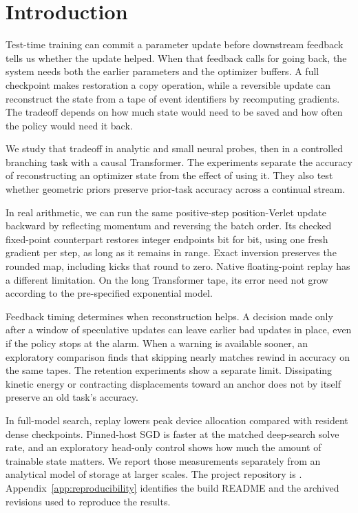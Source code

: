 \section{Introduction}
\label{sec:introduction}

Test-time training can commit a parameter update before downstream
feedback tells us whether the update helped. When that feedback calls for
going back, the system needs both the earlier parameters and the optimizer
buffers. A full checkpoint makes restoration a copy operation, while a
reversible update can reconstruct the state from a tape of event
identifiers by recomputing gradients. The tradeoff depends on how much
state would need to be saved and how often the policy would need it back.

We study that tradeoff in analytic and small neural probes, then in a
controlled branching task with a causal Transformer. The experiments
separate the accuracy of reconstructing an optimizer state from the
effect of using it. They also test whether geometric priors preserve
prior-task accuracy across a continual stream.

In real arithmetic, we can run the same positive-step position-Verlet
update backward by reflecting momentum and reversing the batch order.
Its checked fixed-point counterpart restores integer endpoints bit for bit,
using one fresh gradient per step, as long as it remains in range.
Exact inversion preserves the rounded map, including kicks that round to
zero. Native floating-point replay has a different limitation. On the long
Transformer tape, its error need not grow according to the pre-specified
exponential model.

Feedback timing determines when reconstruction helps. A decision made
only after a window of speculative updates can leave earlier bad updates
in place, even if the policy stops at the alarm. When a warning is
available sooner, an exploratory comparison finds that skipping nearly
matches rewind in accuracy on the same tapes. The retention experiments
show a separate limit. Dissipating kinetic energy or contracting
displacements toward an anchor does not by itself preserve an old
task's accuracy.

In full-model search, replay lowers peak device allocation compared with
resident dense checkpoints. Pinned-host SGD is faster at the
matched deep-search solve rate, and an exploratory head-only control
shows how much the amount of trainable state matters. We report those
measurements separately from an analytical model of storage at larger
scales. The project repository is \RepoLink{}. Appendix~\ref{app:reproducibility}
identifies the build README and the archived revisions used to reproduce
the results.
